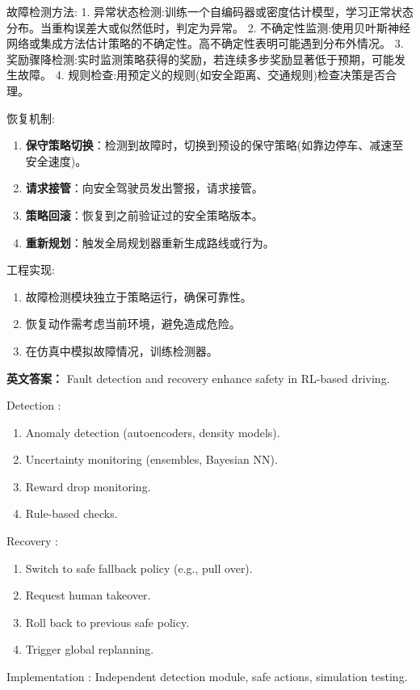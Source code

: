 \documentclass[10pt,a4paper]{ctexart}
\begin{document}
 故障检测方法:
1.  异常状态检测:训练一个自编码器或密度估计模型，学习正常状态分布。当重构误差大或似然低时，判定为异常。
2.  不确定性监测:使用贝叶斯神经网络或集成方法估计策略的不确定性。高不确定性表明可能遇到分布外情况。
3.  奖励骤降检测:实时监测策略获得的奖励，若连续多步奖励显著低于预期，可能发生故障。
4.  规则检查:用预定义的规则(如安全距离、交通规则)检查决策是否合理。

 恢复机制:
\begin{enumerate}
    \item \textbf{保守策略切换}：检测到故障时，切换到预设的保守策略(如靠边停车、减速至安全速度)。
    \item \textbf{请求接管}：向安全驾驶员发出警报，请求接管。
    \item \textbf{策略回滚}：恢复到之前验证过的安全策略版本。
    \item \textbf{重新规划}：触发全局规划器重新生成路线或行为。
\end{enumerate}

 工程实现:
\begin{enumerate}
    \item 故障检测模块独立于策略运行，确保可靠性。
    \item 恢复动作需考虑当前环境，避免造成危险。
    \item 在仿真中模拟故障情况，训练检测器。
\end{enumerate}

\textbf{英文答案：}  
Fault detection and recovery enhance safety in RL-based driving.

 Detection :
\begin{enumerate}
    \item Anomaly detection (autoencoders, density models).
    \item Uncertainty monitoring (ensembles, Bayesian NN).
    \item Reward drop monitoring.
    \item Rule-based checks.
\end{enumerate}

 Recovery :
\begin{enumerate}
    \item Switch to safe fallback policy (e.g., pull over).
    \item Request human takeover.
    \item Roll back to previous safe policy.
    \item Trigger global replanning.
\end{enumerate}

 Implementation : Independent detection module, safe actions, simulation testing.
\end{document}
